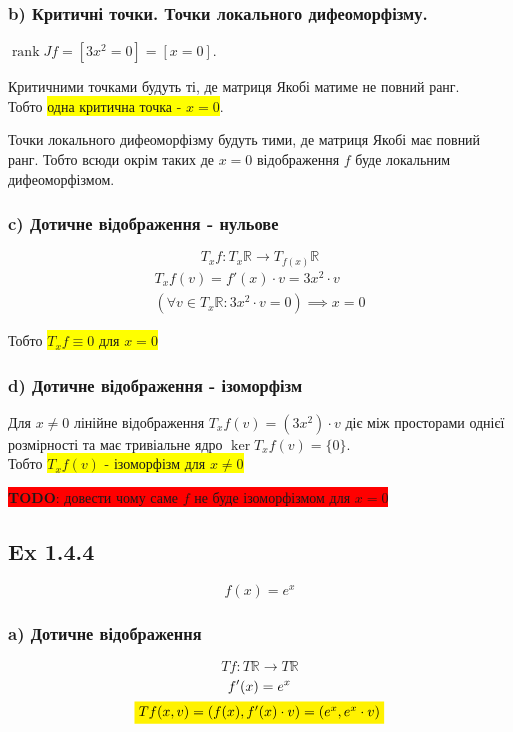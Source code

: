 \documentclass[10pt, a4paper]{article} %
\newcommand{\R}{\mathbb{R}}
\DeclareMathOperator{\rank}{rank}
\newcommand{\todo}[1]{\colorbox{red}{\textbf{TODO}: #1}}
\begin{document}
\subsubsection*{b) Критичні точки. Точки локального дифеоморфізму.}
$\rank Jf = [3x^2 = 0] = [x = 0]$.

Критичними точками будуть ті, де матриця Якобі матиме не повний ранг.\\
Тобто \colorbox{yellow}{одна критична точка - $x = 0$}.

Точки локального дифеоморфізму будуть тими, де матриця Якобі має повний ранг.
Тобто всюди окрім таких де $x = 0$ відображення $f$ буде локальним дифеоморфізмом.

\subsubsection*{c) Дотичне відображення - нульове}
\[T_{x}f : T_{x}\R \to T_{f(x)}\R\]
\begin{gather*}
    T_{x}f(v) = f'(x) \cdot v = 3x^2 \cdot v\\
    \left(\forall v\in T_{x}\R: 3x^2 \cdot v = 0\right) \implies  x=0
\end{gather*}

Тобто \colorbox{yellow}{$T_{x}f \equiv 0$ для $x=0$}

\subsubsection*{d) Дотичне відображення - ізоморфізм}

Для $x \ne 0$ лінійне відображення $T_{x}f(v) = (3x^2) \cdot v$ діє між просторами однієї розмірності та має тривіальне ядро $\ker T_{x}f(v) = \{0\}$. \\
Тобто \colorbox{yellow}{$T_{x}f(v)$ - ізоморфізм для $x\ne 0$}

\todo{довести чому саме $f$ не буде ізоморфізмом для $x = 0$}


\subsection*{Ex 1.4.4}
\begin{mdframed}
    \[f(x) = e^x\]
\end{mdframed}

\subsubsection*{a) Дотичне відображення}
\[Tf : T\R \to T\R\]
\begin{gather*}
    f'(x) = e^x\\
    \colorbox{yellow}{$Tf(x,v) = (f(x), f'(x)\cdot v) = (e^x, e^x \cdot v)$}
\end{gather*}
\end{document}
